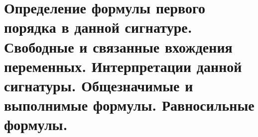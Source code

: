 \section{Определение формулы первого порядка в данной сигнатуре. Свободные и связанные вхождения переменных. Интерпретации данной сигнатуры. Общезначимые и выполнимые формулы. Равносильные формулы.}